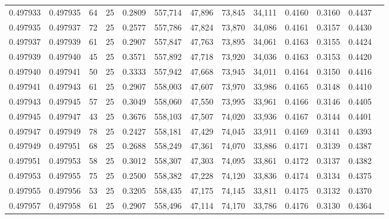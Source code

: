 \begin{tabular}{rrrrrrrrrrrrr}
0.497933 & 0.497935 &    64 &  25 &                                     0.2809 & 557,714 &  47,896 &  73,845 &  34,111 & 0.4160 & 0.3160 & 0.4437 \\
0.497935 & 0.497937 &    72 &  25 &                                     0.2577 & 557,786 &  47,824 &  73,870 &  34,086 & 0.4161 & 0.3157 & 0.4430 \\
0.497937 & 0.497939 &    61 &  25 &                                     0.2907 & 557,847 &  47,763 &  73,895 &  34,061 & 0.4163 & 0.3155 & 0.4424 \\
0.497939 & 0.497940 &    45 &  25 &                                     0.3571 & 557,892 &  47,718 &  73,920 &  34,036 & 0.4163 & 0.3153 & 0.4420 \\
0.497940 & 0.497941 &    50 &  25 &                                     0.3333 & 557,942 &  47,668 &  73,945 &  34,011 & 0.4164 & 0.3150 & 0.4416 \\
0.497941 & 0.497943 &    61 &  25 &                                     0.2907 & 558,003 &  47,607 &  73,970 &  33,986 & 0.4165 & 0.3148 & 0.4410 \\
0.497943 & 0.497945 &    57 &  25 &                                     0.3049 & 558,060 &  47,550 &  73,995 &  33,961 & 0.4166 & 0.3146 & 0.4405 \\
0.497945 & 0.497947 &    43 &  25 &                                     0.3676 & 558,103 &  47,507 &  74,020 &  33,936 & 0.4167 & 0.3144 & 0.4401 \\
0.497947 & 0.497949 &    78 &  25 &                                     0.2427 & 558,181 &  47,429 &  74,045 &  33,911 & 0.4169 & 0.3141 & 0.4393 \\
0.497949 & 0.497951 &    68 &  25 &                                     0.2688 & 558,249 &  47,361 &  74,070 &  33,886 & 0.4171 & 0.3139 & 0.4387 \\
0.497951 & 0.497953 &    58 &  25 &                                     0.3012 & 558,307 &  47,303 &  74,095 &  33,861 & 0.4172 & 0.3137 & 0.4382 \\
0.497953 & 0.497955 &    75 &  25 &                                     0.2500 & 558,382 &  47,228 &  74,120 &  33,836 & 0.4174 & 0.3134 & 0.4375 \\
0.497955 & 0.497956 &    53 &  25 &                                     0.3205 & 558,435 &  47,175 &  74,145 &  33,811 & 0.4175 & 0.3132 & 0.4370 \\
0.497957 & 0.497958 &    61 &  25 &                                     0.2907 & 558,496 &  47,114 &  74,170 &  33,786 & 0.4176 & 0.3130 & 0.4364 \\

\end{tabular}
